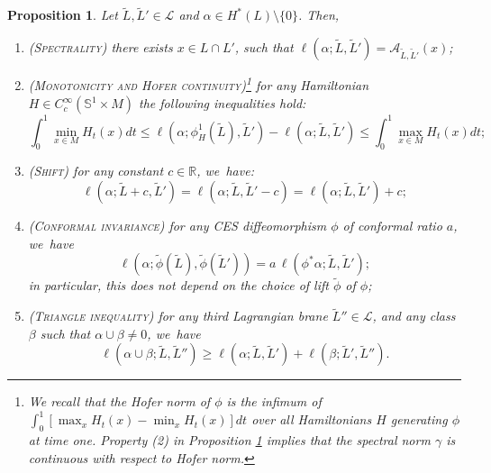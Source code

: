 \documentclass[10pt,a4paper]{amsart}
\newtheorem{prop}[thm]{Proposition}
\theoremstyle{definition}
\newcommand {\LL}{{\mathcal L}}
\newcommand{\R}{\mathbb{R}}
\begin{document}
\begin{prop} Let $\tilde L,\tilde L'\in\LL$ and $\alpha\in H^*(L)\setminus\{0\}$. Then,
\label{prop:lag-spec-inv-properties}
\begin{enumerate}
\item \textsc{(Spectrality)} there exists $x\in L\cap L'$, such that $\ell(\alpha;\tilde L,\tilde L')=\mathcal A_{\tilde L,\tilde L'}(x)$;
\item \textsc{(Monotonicity and Hofer continuity)}\footnote{We recall that the Hofer norm of $\phi$ is the infimum of $\int_0^1 \left[\max_{x}H_t(x)-\min_{x}H_t(x)\right]dt$ over all Hamiltonians $H$ generating $\phi$ at time one. Property (2) in Proposition \ref{prop:lag-spec-inv-properties} implies that the spectral norm $\gamma$ is continuous with respect to Hofer norm.} for any Hamiltonian $H\in C^\infty_c(\mathbb{S}^1\times M)$ the following inequalities hold:
\[
\int_0^1\min_{x\in M} H_t(x) dt\leq \ell(\alpha;\phi_H^1(\tilde L),\tilde L')-\ell(\alpha;\tilde L,\tilde L')\leq \int_0^1\max_{x\in M} H_t(x) dt;
\]
\item \textsc{(Shift)} for any constant $c\in\R$, we~have:
\[
\ell(\alpha;\tilde L+c,\tilde L')=\ell(\alpha;\tilde L,\tilde L'-c)=\ell(\alpha;\tilde L,\tilde L')+c;
\]
\item \textsc{(Conformal invariance)} for any CES diffeomorphism $\phi$ of conformal ratio $a$, we~have
\[
\ell(\alpha;\tilde \phi(\tilde L),\tilde \phi(\tilde L'))=a\, \ell(\phi^*\alpha; \tilde L, \tilde L');
\]
in particular, this does not depend on the choice of lift $\tilde \phi$ of $\phi$;
\item \textsc{(Triangle inequality)} for any third Lagrangian brane $\tilde L''\in\LL$, and any class $\beta$ such that $\alpha\cup\beta\neq 0$, we~have
\[
\ell(\alpha\cup\beta;\tilde L,\tilde L'')\geq \ell(\alpha;\tilde L,\tilde L')+\ell(\beta;\tilde L',\tilde L'').
\]
\end{enumerate}
\end{prop}
\end{document}
